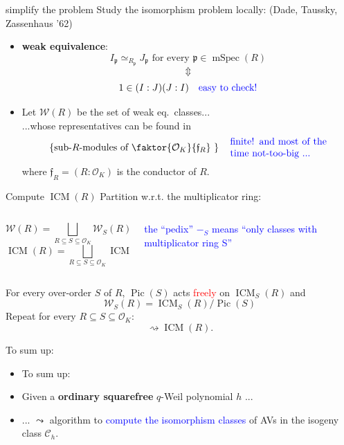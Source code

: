 \documentclass[usenames,dvipsnames,handout]{beamer}
\DeclareMathOperator{\ICM}{ICM}
\DeclareMathOperator{\Pic}{Pic}
\DeclareMathOperator{\mSpec}{mSpec}
\newcommand{\cC}{{\mathcal C}}
\newcommand{\cO}{{\mathcal O}}
\newcommand{\cW}{{\mathcal W}}
\newcommand{\p}{{\mathfrak p}}
\newcommand{\frf}{{\mathfrak f}}
\newcommand{\set}[1]{\left\lbrace#1\right\rbrace }
\newcommand{\red}[1]{\textcolor{red}{#1}}
\newcommand{\blue}[1]{\textcolor{blue}{#1}}
\begin{document}
\begin{frame}{ simplify the problem  }
    Study the isomorphism problem locally: (Dade, Taussky, Zassenhaus '62)
    \begin{itemize}
\pause 
    \item  \textbf{weak equivalence}:
    \[I_{\p}\simeq_{R_{\p}} J_{\p} \text{ for every } {\p} \in \mSpec(R)\]
\pause
    \vspace{-6mm}\[\Updownarrow\]
    \[1\in (I:J)(J:I)\quad \textcolor{blue}{\text{easy to check!}}\]
\pause
    \item Let $\cW(R)$ be the set of weak eq.~classes...\\
\pause
    ...whose representatives can be found in
    \[\set{\text{sub-$R$-modules of $\faktor{\cO_K}{\frf_R}$ }} \quad \textcolor{blue}{\parbox{10 em}{finite! and most of the time not-too-big ...}}\]
    where $\frf_R=(R:\cO_K)$ is the conductor of $R$.
    \end{itemize}
\end{frame}

\begin{frame}{ Compute $\ICM(R)$ }
\pause 
    Partition w.r.t. the multiplicator ring:
    \begin{columns}
    \begin{column}{0.5\textwidth}
      \[ \cW(R) = \bigsqcup_{R\subseteq S \subseteq \cO_K} \cW_S(R)\]
      \[ \ICM(R) = \bigsqcup_{R\subseteq S \subseteq \cO_K} \ICM_S(R)\]
    \end{column}
\pause
    \begin{column}{0.5\textwidth}  %
    \begin{center}
    \textcolor{blue}{\parbox{10em}{the ``pedix'' $-_S$ means ``only classes with multiplicator ring S''}} 
    \end{center}
    \end{column}
    \end{columns}
\pause
    \begin{theorem}[M.]
    For every over-order $S$ of $R$, $\Pic(S)$ acts \red{freely} on $\ICM_S(R)$ and
    \[ \cW_S(R) = \ICM_S(R) / \Pic(S) \]
\pause
    Repeat for every $R\subseteq S \subseteq \cO_K$:
    \[ \rightsquigarrow \ICM(R).\]
    \end{theorem}
\end{frame}


\begin{frame}{ To sum up: }
    \begin{itemize}
    \item To sum up:
\pause
    \item Given a {\bf ordinary squarefree} $q$-Weil polynomial $h$ ...
\pause
    \item ... $\leadsto$ algorithm to \blue{compute the isomorphism classes} of AVs in the isogeny class $\cC_h$.
    \end{itemize}
\end{frame}
\end{document}
